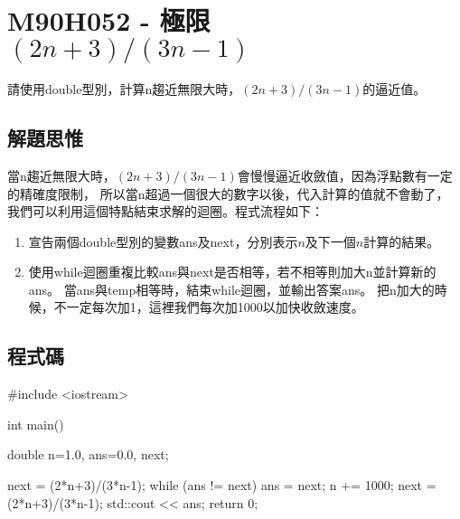 \section{M90H052 - 極限 $(2n+3)/(3n-1)$}
\label{M90H052}
請使用double型別，計算n趨近無限大時，$(2n+3)/(3n-1)$的逼近值。

\subsection{解題思惟}
當n趨近無限大時，$(2n+3)/(3n-1)$會慢慢逼近收斂值，因為浮點數有一定的精確度限制，
所以當n超過一個很大的數字以後，代入計算的值就不會動了，
我們可以利用這個特點結束求解的迴圈。程式流程如下：
\begin{enumerate}
	\item 宣告兩個double型別的變數ans及next，分別表示$n$及下一個$n$計算的結果。
	\item 使用while迴圈重複比較ans與next是否相等，若不相等則加大n並計算新的ans。
	當ans與temp相等時，結束while迴圈，並輸出答案ans。
	把n加大的時候，不一定每次加1，這裡我們每次加1000以加快收斂速度。
\end{enumerate}


\subsection{程式碼}
\begin{cppcode}
#include <iostream>

int main()
{
	double n=1.0, ans=0.0, next;
	
	next = (2*n+3)/(3*n-1);
	while (ans != next) {
		ans = next;
		n += 1000;
		next = (2*n+3)/(3*n-1);
	}
	std::cout << ans;
	return 0;
}
\end{cppcode}
